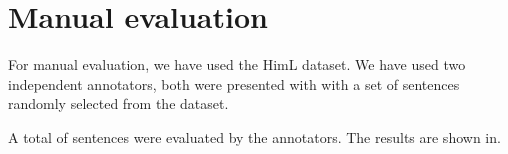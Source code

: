 \section{Manual evaluation}

For manual evaluation, we have used the HimL dataset. We have used two independent annotators, both were presented with 
with a set of sentences randomly selected from the dataset.

A total of  sentences were evaluated by the annotators. The results are shown in.

